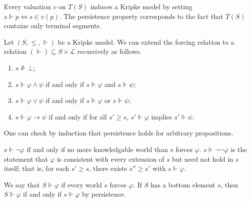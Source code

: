 Every valuation \( v \) on \( T(S) \) induces a Kripke model by setting \( s \Vdash p \iff s \in v(p) \).
The persistence property corresponds to the fact that \( T(S) \) contains only terminal segments.
\begin{definition}
    Let \( (S, \leq, \Vdash) \) be a Kripke model.
    We can extend the forcing relation to a relation \( (\Vdash) \subseteq S \times \mathcal L \) recursively as follows.
    \begin{enumerate}
        \item \( s \nVdash \bot \);
        \item \( s \Vdash \varphi \wedge \psi \) if and only if \( s \Vdash \varphi \) and \( s \Vdash \psi \);
        \item \( s \Vdash \varphi \vee \psi \) if and only if \( s \Vdash \varphi \) or \( s \Vdash \psi \);
        \item \( s \Vdash \varphi \to \psi \) if and only if for all \( s' \geq s \), \( s' \Vdash \varphi \) implies \( s' \Vdash \psi \).
    \end{enumerate}
\end{definition}
One can check by induction that persistence holds for arbitrary propositions.
\begin{remark}
    \( s \Vdash \neg\varphi \) if and only if no more knowledgable world than \( s \) forces \( \varphi \).
    \( s \Vdash \neg\neg\varphi \) is the statement that \( \varphi \) is consistent with every extension of \( s \) but need not hold in \( s \) itself; that is, for each \( s' \geq s \), there exists \( s'' \geq s' \) with \( s \Vdash \varphi \).
\end{remark}
We say that \( S \Vdash \varphi \) if every world \( s \) forces \( \varphi \).
If \( S \) has a bottom element \( s \), then \( S \Vdash \varphi \) if and only if \( s \Vdash \varphi \) by persistence.
